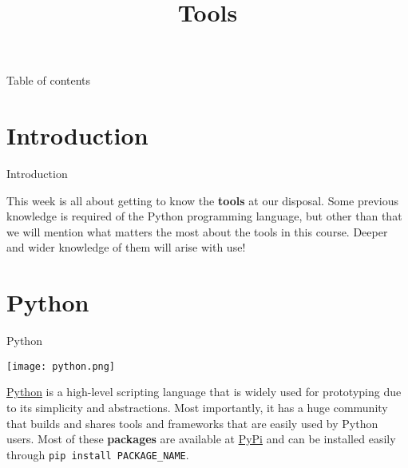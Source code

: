 \documentclass[aspectratio=43]{beamer}
\title{\q Tools}
\begin{document}
\begin{frame}
	\titlepage
\end{frame}


\begin{frame}{Table of contents}
	\begin{card}
		\tableofcontents
	\end{card}
\end{frame}


\section{Introduction}
\begin{frame}{Introduction}
    \begin{card}
    This week is all about getting to know the \textbf{tools} at our disposal. Some previous knowledge is required of the Python programming language, but other than that we will mention what matters the most about the tools in this course. Deeper and wider knowledge of them will arise with use!
    \end{card}
\pagenumber
\end{frame}


\section{Python}
\begin{frame}{Python}
    \begin{center}
	    \texttt{[image: python.png]}
	\end{center}
    \begin{card}
        \href{https://www.python.org/}{Python} is a high-level scripting language that is widely used for prototyping due to its simplicity and abstractions. Most importantly, it has a huge community that builds and shares tools and frameworks that are easily used by Python users. Most of these \textbf{packages} are available at \href{https://pypi.org/}{PyPi} and can be installed easily through \texttt{pip install PACKAGE_NAME}. 
    \end{card}
\pagenumber
\end{frame}
\end{document}
